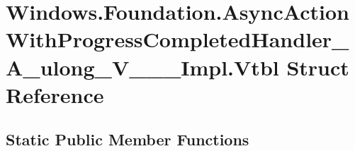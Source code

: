 \hypertarget{struct_windows_1_1_foundation_1_1_async_action_with_progress_completed_handler___a__ulong___v_______impl_1_1_vtbl}{}\section{Windows.\+Foundation.\+Async\+Action\+With\+Progress\+Completed\+Handler\+\_\+\+A\+\_\+ulong\+\_\+\+V\+\_\+\+\_\+\+\_\+\+Impl.\+Vtbl Struct Reference}
\label{struct_windows_1_1_foundation_1_1_async_action_with_progress_completed_handler___a__ulong___v_______impl_1_1_vtbl}
\subsection*{Static Public Member Functions}
